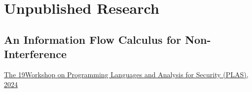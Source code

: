 

\chapter{Unpublished Research}\label{ch:unpublished-research}\clearpage

\section{An Information Flow Calculus for Non-Interference}\label{ni-analysis}
{\href{https://plas24.github.io}
{The 19\thsup Workshop on Programming Languages and Analysis for Security (PLAS), 2024}}
{\abspage{}}

\clearpage

